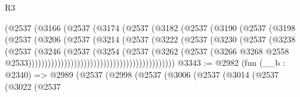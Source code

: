 \begin{lexlean}{R3}
\begin{coremodule}
                                      (@2537
                                        (@3166
                                          (@2537
                                            (@3174
                                              (@2537
                                                (@3182
                                                  (@2537
                                                    (@3190
                                                      (@2537
                                                        (@3198
                                                          (@2537
                                                            (@3206
                                                              (@2537
                                                                (@3214
                                                                  (@2537
                                                                    (@3222
                                                                      (@2537
                                                                        (@3230
                                                                          (@2537
                                                                            (@3238
                                                                              (@2537
                                                                                (@3246
                                                                                  (@2537
                                                                                    (@3254
                                                                                      (@2537
                                                                                        (@3262
                                                                                          (@2537
                                                                                            (@3266
                                                                                              @3268
                                                                                              @2558
                                                                                              @2533)))))))))))))))))))))))))))))))))))))))))))))
@3343 := @2982
    (fun (__b : @2340) =>
    @2989
      (@2537
        (@2998
          (@2537
            (@3006
              (@2537
                (@3014
                  (@2537
                    (@3022
                      (@2537

\end{coremodule}
\end{lexlean}
